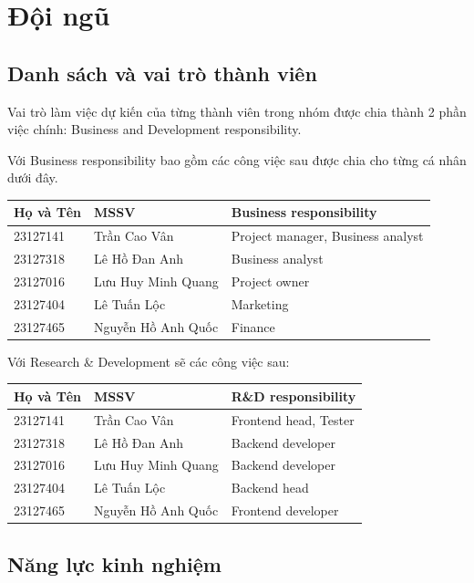 \section{Đội ngũ}

\subsection{Danh sách và vai trò thành viên}

Vai trò làm việc dự kiến của từng thành viên trong nhóm được chia thành 2 phần việc chính: Business and Development responsibility.

Với Business responsibility bao gồm các công việc sau được chia cho từng cá nhân dưới đây.

\vspace{0.25cm}
\begin{tabular}{l l l}
\toprule
\textbf{Họ và Tên} & \textbf{MSSV} & \textbf{Business responsibility} \\
\midrule
23127141 & Trần Cao Vân & Project manager, Business analyst \\
23127318 & Lê Hồ Đan Anh & Business analyst \\
23127016 & Lưu Huy Minh Quang & Project owner \\
23127404 & Lê Tuấn Lộc & Marketing \\
23127465 & Nguyễn Hồ Anh Quốc & Finance\\
\bottomrule
\end{tabular}
\vspace{0.5cm}


Với Research \& Development sẽ các công việc sau:

\vspace{0.25cm}
\begin{tabular}{l l l}
\toprule
\textbf{Họ và Tên} & \textbf{MSSV} & \textbf{R\&D responsibility} \\
\midrule
23127141 & Trần Cao Vân & Frontend head, Tester \\
23127318 & Lê Hồ Đan Anh & Backend developer \\
23127016 & Lưu Huy Minh Quang & Backend developer \\
23127404 & Lê Tuấn Lộc & Backend head \\
23127465 & Nguyễn Hồ Anh Quốc & Frontend developer\\
\bottomrule
\end{tabular}
\vspace{0.5cm}


\subsection{Năng lực kinh nghiệm}


